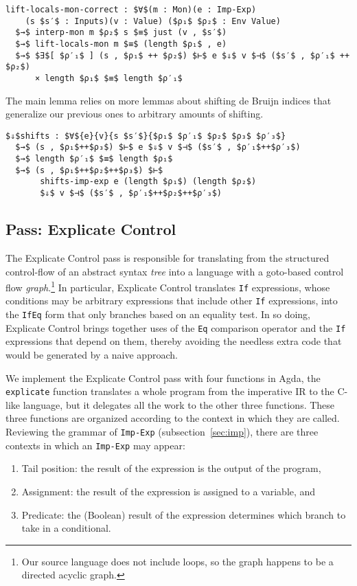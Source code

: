 \documentclass[sigplan,review,dvipsnames,screen,10pt]{acmart}
\begin{document}
\begin{lstlisting}
lift-locals-mon-correct : $∀$(m : Mon)(e : Imp-Exp)
    (s $s′$ : Inputs)(v : Value) ($ρ₁$ $ρ₂$ : Env Value)
  $→$ interp-mon m $ρ₂$ s $≡$ just (v , $s′$)
  $→$ lift-locals-mon m $≡$ (length $ρ₁$ , e)
  $→$ $∃$[ $ρ′₁$ ] (s , $ρ₁$ ++ $ρ₂$) $⊢$ e $⇓$ v $⊣$ ($s′$ , $ρ′₁$ ++ $ρ₂$)
      × length $ρ₁$ $≡$ length $ρ′₁$
\end{lstlisting}

The main lemma relies on more lemmas about shifting de Bruijn indices
that generalize our previous ones to arbitrary amounts of shifting.

\begin{lstlisting}
$⇓$shifts : $∀${e}{v}{s $s′$}{$ρ₁$ $ρ′₁$ $ρ₂$ $ρ₃$ $ρ′₃$} 
  $→$ (s , $ρ₁$++$ρ₃$) $⊢$ e $⇓$ v $⊣$ ($s′$ , $ρ′₁$++$ρ′₃$)
  $→$ length $ρ′₁$ $≡$ length $ρ₁$
  $→$ (s , $ρ₁$++$ρ₂$++$ρ₃$) $⊢$
       shifts-imp-exp e (length $ρ₁$) (length $ρ₂$)
       $⇓$ v $⊣$ ($s′$ , $ρ′₁$++$ρ₂$++$ρ′₃$)
\end{lstlisting}


\subsection{Pass: Explicate Control}

The Explicate Control pass is responsible for translating from the
structured control-flow of an abstract syntax \emph{tree} into a
language with a goto-based control flow \emph{graph}.\footnote{Our
source language does not include loops, so the graph happens to be a
directed acyclic graph.} In particular, Explicate Control translates
\lstinline{If} expressions, whose conditions may be arbitrary
expressions that include other \lstinline{If} expressions, into the
\lstinline{IfEq} form that only branches based on an equality test. In
so doing, Explicate Control brings together uses of the \lstinline{Eq}
comparison operator and the \lstinline{If} expressions that depend on
them, thereby avoiding the needless extra code that would be generated
by a naive approach.

We implement the Explicate Control pass with four functions in Agda,
the \lstinline{explicate} function translates a whole program from the
imperative IR to the C-like language, but it delegates all the work to
the other three functions. These three functions are organized
according to the context in which they are called. Reviewing the
grammar of \lstinline{Imp-Exp} (subsection~\ref{sec:imp}), there are
three contexts in which an \lstinline{Imp-Exp} may appear:
\begin{enumerate}
\item Tail position: the result of the expression is the output of the program,
\item Assignment: the result of the expression is assigned to a variable, and
\item Predicate: the (Boolean) result of the expression determines which
    branch to take in a conditional.
\end{enumerate}
\end{document}
